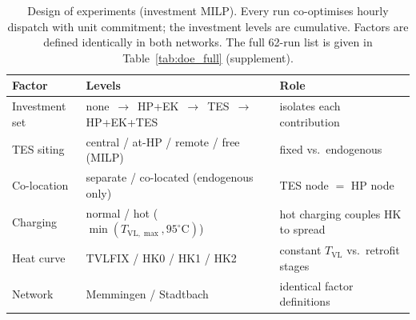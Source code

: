 
\begin{table}[t]
\centering
\caption{Design of experiments (investment MILP). Every run co-optimises hourly
dispatch with unit commitment; the investment levels are cumulative. Factors are
defined identically in both networks. The full 62-run list is given in
Table~\ref{tab:doe_full} (supplement).}
\label{tab:doe_factors}
\small
\begin{tabular}{@{}lp{6.4cm}l@{}}
\toprule
Factor & Levels & Role \\
\midrule
Investment set & none \,$\to$\, HP+EK \,$\to$\, TES \,$\to$\, HP+EK+TES & isolates each contribution \\
TES siting     & central / at-HP / remote / free (MILP) & fixed vs.\ endogenous \\
Co-location    & separate / co-located (endogenous only) & TES node $=$ HP node \\
Charging       & normal / hot ($\min(T_{\mathrm{VL},\max},95^\circ\mathrm{C})$) & hot charging couples HK to spread \\
Heat curve     & TVLFIX / HK0 / HK1 / HK2 & constant $T_{\mathrm{VL}}$ vs.\ retrofit stages \\
Network        & Memmingen / Stadtbach & identical factor definitions \\
\bottomrule
\end{tabular}
\end{table}

